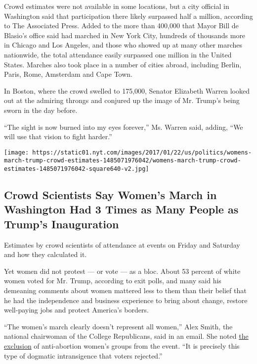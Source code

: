 Crowd estimates were not available in some locations, but a city
official in Washington said that participation there likely surpassed
half a million, according to The Associated Press. Added to the more
than 400,000 that Mayor Bill de Blasio's office said had marched in New
York City, hundreds of thousands more in Chicago and Los Angeles, and
those who showed up at many other marches nationwide, the total
attendance easily surpassed one million in the United States. Marches
also took place in a number of cities abroad, including Berlin, Paris,
Rome, Amsterdam and Cape Town.

In Boston, where the crowd swelled to 175,000, Senator Elizabeth Warren
looked out at the admiring throngs and conjured up the image of Mr.
Trump's being sworn in the day before.

``The sight is now burned into my eyes forever,'' Ms. Warren said,
adding, ``We will use that vision to fight harder.''

\href{https://www.nytimes.com/interactive/2017/01/22/us/politics/womens-march-trump-crowd-estimates.html}{}

\texttt{[image: https://static01.nyt.com/images/2017/01/22/us/politics/womens-march-trump-crowd-estimates-1485071976042/womens-march-trump-crowd-estimates-1485071976042-square640-v2.jpg]}

\hypertarget{crowd-scientists-say-womens-march-in-washington-had-3-times-as-many-people-as-trumps-inauguration}{%
\subsection{Crowd Scientists Say Women's March in Washington Had 3 Times
as Many People as Trump's
Inauguration}\label{crowd-scientists-say-womens-march-in-washington-had-3-times-as-many-people-as-trumps-inauguration}}

Estimates by crowd scientists of attendance at events on Friday and
Saturday and how they calculated it.

Yet women did not protest --- or vote --- as a bloc. About 53 percent of
white women voted for Mr. Trump, according to exit polls, and many said
his demeaning comments about women mattered less to them than their
belief that he had the independence and business experience to bring
about change, restore well-paying jobs and protect America's borders.

``The women's march clearly doesn't represent all women,'' Alex Smith,
the national chairwoman of the College Republicans, said in an email.
She noted
\href{https://www.nytimes.com/2017/01/18/us/womens-march-abortion.html}{the
exclusion} of anti-abortion women's groups from the event. ``It is
precisely this type of dogmatic intransigence that voters rejected.''

